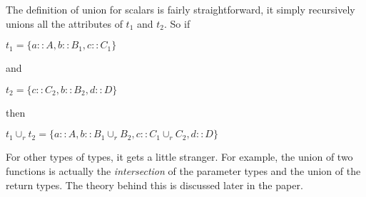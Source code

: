 \documentclass{scrartcl}
\begin{document}
\begin{multicols}{2}
The definition of union for scalars is fairly straightforward, it simply
recursively unions all the attributes of $t_1$ and $t_2$. So if

$t_1 = \{a :: A, b :: B_1, c :: C_1\}$

and

$t_2 = \{c :: C_2, b :: B_2, d :: D\}$

then

$t_1 \cup_r t_2 = \{a :: A, b :: B_1 \cup_r B_2, c :: C_1 \cup_r C_2, d :: D\}$

For other types of types, it gets a little stranger. For example, the union
of two functions is actually the \emph{intersection} of the parameter types
and the union of the return types. The theory behind this is discussed later
in the paper.




\vspace{\textheight}
\end{multicols}
\end{document}
